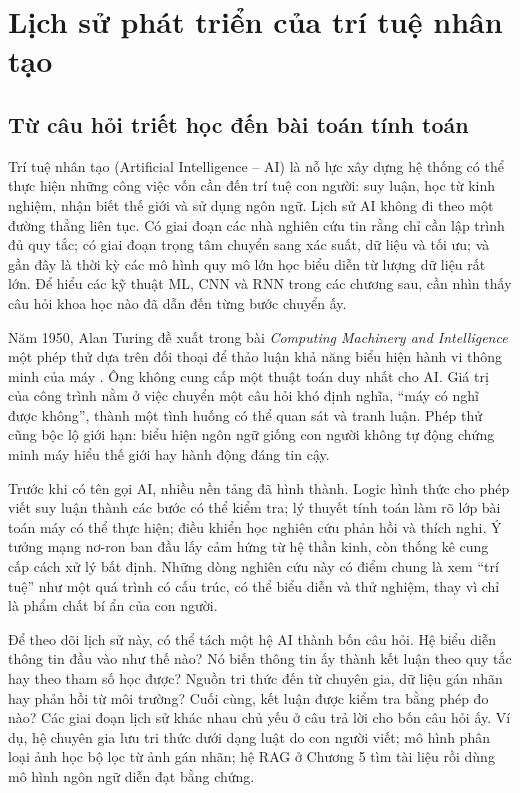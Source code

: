 \documentclass[12pt,a4paper]{report}
\begin{document}
\chapter{Lịch sử phát triển của trí tuệ nhân tạo}\label{ch:history}
\section{Từ câu hỏi triết học đến bài toán tính toán}
Trí tuệ nhân tạo (Artificial Intelligence -- AI) là nỗ lực xây dựng hệ thống có thể thực hiện những công việc vốn cần đến trí tuệ con người: suy luận, học từ kinh nghiệm, nhận biết thế giới và sử dụng ngôn ngữ. Lịch sử AI không đi theo một đường thẳng liên tục. Có giai đoạn các nhà nghiên cứu tin rằng chỉ cần lập trình đủ quy tắc; có giai đoạn trọng tâm chuyển sang xác suất, dữ liệu và tối ưu; và gần đây là thời kỳ các mô hình quy mô lớn học biểu diễn từ lượng dữ liệu rất lớn. Để hiểu các kỹ thuật ML, CNN và RNN trong các chương sau, cần nhìn thấy câu hỏi khoa học nào đã dẫn đến từng bước chuyển ấy.

Năm 1950, Alan Turing đề xuất trong bài \textit{Computing Machinery and Intelligence} một phép thử dựa trên đối thoại để thảo luận khả năng biểu hiện hành vi thông minh của máy \cite{turing1950}. Ông không cung cấp một thuật toán duy nhất cho AI. Giá trị của công trình nằm ở việc chuyển một câu hỏi khó định nghĩa, ``máy có nghĩ được không'', thành một tình huống có thể quan sát và tranh luận. Phép thử cũng bộc lộ giới hạn: biểu hiện ngôn ngữ giống con người không tự động chứng minh máy hiểu thế giới hay hành động đáng tin cậy.

Trước khi có tên gọi AI, nhiều nền tảng đã hình thành. Logic hình thức cho phép viết suy luận thành các bước có thể kiểm tra; lý thuyết tính toán làm rõ lớp bài toán máy có thể thực hiện; điều khiển học nghiên cứu phản hồi và thích nghi. Ý tưởng mạng nơ-ron ban đầu lấy cảm hứng từ hệ thần kinh, còn thống kê cung cấp cách xử lý bất định. Những dòng nghiên cứu này có điểm chung là xem ``trí tuệ'' như một quá trình có cấu trúc, có thể biểu diễn và thử nghiệm, thay vì chỉ là phẩm chất bí ẩn của con người.

Để theo dõi lịch sử này, có thể tách một hệ AI thành bốn câu hỏi. Hệ biểu diễn thông tin đầu vào như thế nào? Nó biến thông tin ấy thành kết luận theo quy tắc hay theo tham số học được? Nguồn tri thức đến từ chuyên gia, dữ liệu gán nhãn hay phản hồi từ môi trường? Cuối cùng, kết luận được kiểm tra bằng phép đo nào? Các giai đoạn lịch sử khác nhau chủ yếu ở câu trả lời cho bốn câu hỏi ấy. Ví dụ, hệ chuyên gia lưu tri thức dưới dạng luật do con người viết; mô hình phân loại ảnh học bộ lọc từ ảnh gán nhãn; hệ RAG ở Chương 5 tìm tài liệu rồi dùng mô hình ngôn ngữ diễn đạt bằng chứng.
\end{document}
